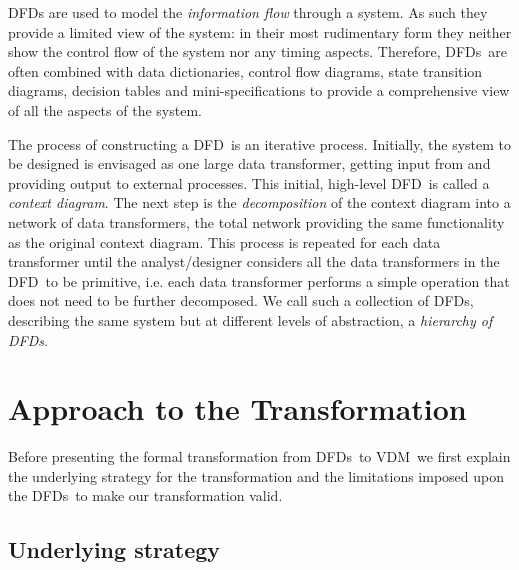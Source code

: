 \documentclass[11pt]{article}
\newcommand{\VDM}{{\small VDM}}
\newcommand{\DFD}{{\small DFD}}
\newcommand{\DFDs}{{\small DFD}s}
\begin{document}
\DFD s are used to model the {\em information flow} through a system.
As such they provide a limited view of the system:
in their most rudimentary form they neither show the control flow of the system
nor any timing aspects.
Therefore, \DFDs\ are often combined with data dictionaries,
control flow diagrams, state transition diagrams, decision tables
and mini-specifications to provide a comprehensive view of all the 
aspects of the system.

The process of constructing a \DFD\ is an iterative process.
Initially, the system to be designed is envisaged as one large data transformer,
getting input from and providing output to external processes.
This initial, high-level \DFD\ is called a {\em context diagram}.
The next step is the {\em decomposition}
of the context diagram into a network of data transformers,
the total network providing the same functionality as the original
context diagram.
This process is repeated for each data transformer until the analyst/designer
considers all the data transformers in the \DFD\ to be primitive,
i.e. each data transformer performs a simple operation that does not
need to be further decomposed.
We call such a collection of \DFDs, describing the same system but at different
levels of abstraction, a {\em hierarchy of DFDs}.

\section{Approach to the Transformation}
\label{sec:motivation}

Before presenting the formal transformation from \DFDs\ to \VDM\ we first explain
the underlying strategy for the transformation and the limitations
imposed upon the \DFDs\ to make our transformation valid.

\subsection{Underlying strategy}
\end{document}
